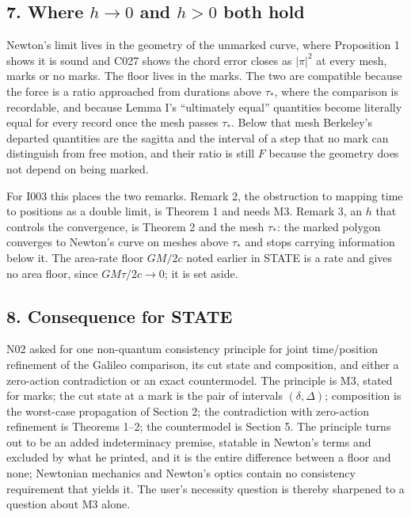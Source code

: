 \documentclass[11pt,a4paper]{article}
\begin{document}
\hypertarget{where-hto0-and-h0-both-hold}{%
\subsection{\texorpdfstring{7. Where \(h\to0\) and \(h>0\) both
hold}{7. Where h\textbackslash to0 and h\textgreater0 both hold}}\label{where-hto0-and-h0-both-hold}}

Newton's limit lives in the geometry of the unmarked curve, where
Proposition 1 shows it is sound and C027 shows the chord error closes as
\(|\pi|^2\) at every mesh, marks or no marks. The floor lives in the
marks. The two are compatible because the force is a ratio approached
from durations above \(\tau_*\), where the comparison is recordable, and
because Lemma I's ``ultimately equal'' quantities become literally equal
for every record once the mesh passes \(\tau_*\). Below that mesh
Berkeley's departed quantities are the sagitta and the interval of a
step that no mark can distinguish from free motion, and their ratio is
still \(F\) because the geometry does not depend on being marked.

For I003 this places the two remarks. Remark 2, the obstruction to
mapping time to positions as a double limit, is Theorem 1 and needs M3.
Remark 3, an \(h\) that controls the convergence, is Theorem 2 and the
mesh \(\tau_*\): the marked polygon converges to Newton's curve on
meshes above \(\tau_*\) and stops carrying information below it. The
area-rate floor \(GM/2c\) noted earlier in STATE is a rate and gives no
area floor, since \(GM\tau/2c\to0\); it is set aside.

\hypertarget{consequence-for-state}{%
\subsection{8. Consequence for STATE}\label{consequence-for-state}}

N02 asked for one non-quantum consistency principle for joint
time/position refinement of the Galileo comparison, its cut state and
composition, and either a zero-action contradiction or an exact
countermodel. The principle is M3, stated for marks; the cut state at a
mark is the pair of intervals \((\delta,\Delta)\); composition is the
worst-case propagation of Section 2; the contradiction with zero-action
refinement is Theorems 1--2; the countermodel is Section 5. The
principle turns out to be an added indeterminacy premise, statable in
Newton's terms and excluded by what he printed, and it is the entire
difference between a floor and none; Newtonian mechanics and Newton's
optics contain no consistency requirement that yields it. The user's
necessity question is thereby sharpened to a question about M3 alone.
\end{document}
